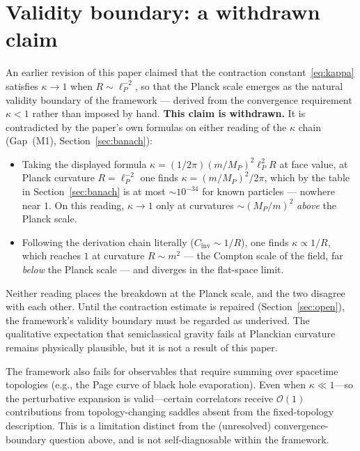 \documentclass[12pt,a4paper]{article}
\begin{document}
\section{Validity boundary: a withdrawn claim}
\label{sec:planck}

An earlier revision of this paper claimed that the contraction
constant~\eqref{eq:kappa} satisfies $\kappa \to 1$ when $R \sim \ell_P^{-2}$, so that
the Planck scale emerges as the natural validity boundary of the framework --- derived
from the convergence requirement $\kappa < 1$ rather than imposed by hand. \textbf{This
claim is withdrawn.} It is contradicted by the paper's own formulas on either reading of
the $\kappa$ chain (Gap~(M1), Section~\ref{sec:banach}):

\begin{itemize}
\item Taking the displayed formula $\kappa = (1/2\pi)(m/M_P)^2\ell_P^2 R$ at face value,
at Planck curvature $R = \ell_P^{-2}$ one finds $\kappa = (m/M_P)^2/2\pi$, which by the
table in Section~\ref{sec:banach} is at most $\sim 10^{-34}$ for known particles ---
nowhere near $1$. On this reading, $\kappa \to 1$ only at curvatures
$\sim (M_P/m)^2$ \emph{above} the Planck scale.
\item Following the derivation chain literally ($C_{\mathrm{inv}} \sim 1/R$), one finds
$\kappa \propto 1/R$, which reaches $1$ at curvature $R \sim m^2$ --- the Compton scale
of the field, far \emph{below} the Planck scale --- and diverges in the flat-space limit.
\end{itemize}

\noindent Neither reading places the breakdown at the Planck scale, and the two disagree
with each other. Until the contraction estimate is repaired (Section~\ref{sec:open}),
the framework's validity boundary must be regarded as underived. The qualitative
expectation that semiclassical gravity fails at Planckian curvature remains physically
plausible, but it is not a result of this paper.

The framework also fails for observables that require summing over spacetime topologies
(e.g., the Page curve of black hole evaporation). Even when $\kappa \ll 1$---so the
perturbative expansion is valid---certain correlators receive $\mathcal{O}(1)$
contributions from topology-changing saddles absent from the fixed-topology
description. This is a limitation distinct from the (unresolved) convergence-boundary
question above, and is not self-diagnosable within the framework.
\end{document}
